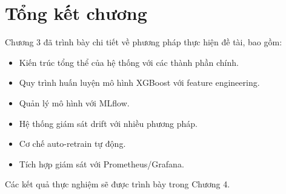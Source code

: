 \section{Tổng kết chương}

Chương 3 đã trình bày chi tiết về phương pháp thực hiện đề tài, bao gồm:

\begin{itemize}
    \item Kiến trúc tổng thể của hệ thống với các thành phần chính.
    \item Quy trình huấn luyện mô hình XGBoost với feature engineering.
    \item Quản lý mô hình với MLflow.
    \item Hệ thống giám sát drift với nhiều phương pháp.
    \item Cơ chế auto-retrain tự động.
    \item Tích hợp giám sát với Prometheus/Grafana.
\end{itemize}

Các kết quả thực nghiệm sẽ được trình bày trong Chương 4.
